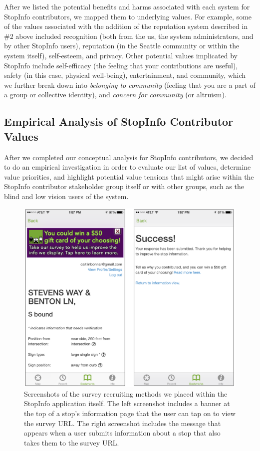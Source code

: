 After we listed the potential benefits and harms associated with each system for StopInfo contributors, we mapped them to underlying values. For example, some of the values associated with the addition of the reputation system described in \#2 above included recognition (both from the us, the system administrators, and by other StopInfo users), reputation (in the Seattle community or within the system itself), self-esteem, and privacy. Other potential values implicated by StopInfo include self-efficacy (the feeling that your contributions are useful), safety (in this case, physical well-being), entertainment, and community, which we further break down into \emph{belonging to community} (feeling that you are a part of a group or collective identity), and \emph{concern for community} (or altruism). 


\subsection{Empirical Analysis of StopInfo Contributor Values}

After we completed our conceptual analysis for StopInfo contributors, we decided to do an empirical investigation in order to evaluate our list of values, determine value priorities, and highlight potential value tensions that might arise within the StopInfo contributor stakeholder group itself or with other groups, such as the blind and low vision users of the system.

\begin{figure}[h]
\centering
\includegraphics[width=.5\textwidth]{SurveyAlerts.png}
\caption{Screenshots of the survey recruiting methods we placed within the StopInfo application itself. The left screenshot includes a banner at the top of a stop's information page that the user can tap on to view the survey URL. The right screenshot includes the message that appears when a user submits information about a stop that also takes them to the survey URL.}
\label{fig:alerts}
\end{figure} 

